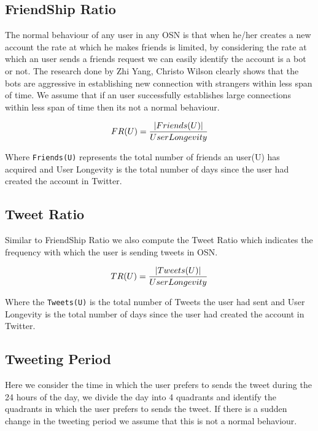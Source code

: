 \documentclass[conference]{IEEEtran}
\begin{document}
\subsection{FriendShip Ratio}
The normal behaviour of any user in any OSN is that when he/her creates a new account the rate at which he makes friends is limited, by considering the rate at which an user sends a friends request we can easily identify the account is a bot or not. The research done by Zhi Yang, Christo Wilson clearly shows that the bots are aggressive in establishing new connection with strangers within less span of time. We assume that if an user successfully establishes large connections within less span of time then its not a normal behaviour.

\begin{equation}
	 FR (U) = \frac{|Friends(U)|}{User Longevity} \\
\end{equation}

Where \verb |Friends(U)| represents the total number of friends an user(U) has acquired and User Longevity is the total number of days since the user had created the account in Twitter. 

\subsection{Tweet Ratio}
Similar to FriendShip Ratio we also compute the Tweet Ratio which indicates the frequency with which the user is sending tweets in OSN.
	
\begin{equation}
	 TR (U) = \frac{|Tweets(U)|}{User Longevity} \\
\end{equation}	

Where the \verb |Tweets(U)| is the total number of Tweets the user had sent and User Longevity is the total number of days since the user had created the account in Twitter.

\subsection{Tweeting Period}
Here we consider the time in which the user prefers to sends the tweet during the 24 hours of the day, we divide the day into 4 quadrants and identify the quadrants in which the user prefers to sends the tweet. If there is a sudden change in the tweeting period we assume that this is not a normal behaviour. \\
\end{document}

